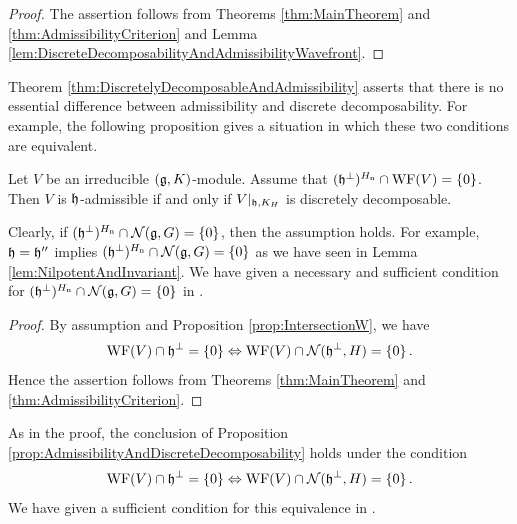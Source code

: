 \begin{proof}
	The assertion follows from Theorems \ref{thm:MainTheorem} and \ref{thm:AdmissibilityCriterion} and Lemma \ref{lem:DiscreteDecomposabilityAndAdmissibilityWavefront}.
\end{proof}

Theorem \ref{thm:DiscretelyDecomposableAndAdmissibility} asserts that there is no essential difference between admissibility and discrete decomposability.
For example, the following proposition gives a situation in which these two conditions are equivalent.

\begin{proposition} \label{prop:AdmissibilityAndDiscreteDecomposability}
	Let $V$ be an irreducible $(\mathfrak{g}, K)$-module.
	Assume that $(\mathfrak{h}^\perp)^{H_{\mathrm{n}}} \cap \mathrm{WF}(V) = \left\{0 \right\}$.
	Then $V$ is $\mathfrak{h}$-admissible if and only if $V|_{\mathfrak{h}, K_H}$ is discretely decomposable.
\end{proposition}

\begin{remark}
	Clearly, if $(\mathfrak{h}^\perp)^{H_{\mathrm{n}}} \cap \mathcal{N}(\mathfrak{g}, G) = \left\{0 \right\}$, then the assumption holds.
	For example, $\mathfrak{h} = \mathfrak{h}''$ implies $(\mathfrak{h}^\perp)^{H_{\mathrm{n}}} \cap \mathcal{N}(\mathfrak{g}, G) = \left\{0 \right\}$ as we have seen in Lemma \ref{lem:NilpotentAndInvariant}.
	We have given a necessary and sufficient condition for $(\mathfrak{h}^\perp)^{H_{\mathrm{n}}} \cap \mathcal{N}(\mathfrak{g}, G) = \left\{0 \right\}$ in \cite[Proposition 22]{Ki24}.
\end{remark}

\begin{proof}
	By assumption and Proposition \ref{prop:IntersectionW}, we have
	\begin{align*}
		\mathrm{WF}(V) \cap \mathfrak{h}^\perp = \left\{0 \right\} \Leftrightarrow \mathrm{WF}(V) \cap \mathcal{N}(\mathfrak{h}^\perp, H) = \left\{0 \right\}.
	\end{align*}
	Hence the assertion follows from Theorems \ref{thm:MainTheorem} and \ref{thm:AdmissibilityCriterion}.
\end{proof}

As in the proof, the conclusion of Proposition \ref{prop:AdmissibilityAndDiscreteDecomposability} holds under the condition
\begin{align*}
	\mathrm{WF}(V) \cap \mathfrak{h}^\perp = \left\{0 \right\} \Leftrightarrow \mathrm{WF}(V) \cap \mathcal{N}(\mathfrak{h}^\perp, H) = \left\{0 \right\}.
\end{align*}
We have given a sufficient condition for this equivalence in \cite[Theorem 23]{Ki24}.

